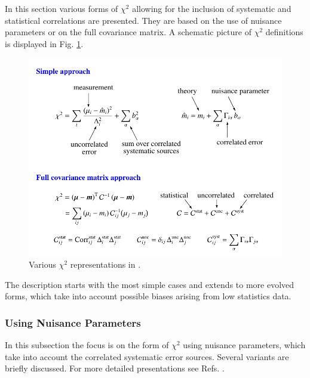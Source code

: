 \label{sec:error}
\label{sec:chi2}
In this section various forms of $\chi^2$ 
allowing for the inclusion of systematic and statistical correlations are presented.
They are based on the use of nuisance parameters or on the full covariance matrix.
A schematic picture of $\chi^2$ definitions is displayed in Fig. \ref{fig:chi2}.
\begin{figure}[htb]
\centerline{
\includegraphics[width=\linewidth]{figures/chi2.pdf}
}
\caption{Various $\chi^2$ representations in \fitter.}
\label{fig:chi2}
\end{figure}
The description starts with the most simple cases and extends to more evolved forms, which take into account possible biases 
arising from low statistics data.

\subsubsection{Using Nuisance Parameters}

\newcommand{\rs}{b}
\newcommand{\ce}{\Gamma}
\newcommand\ci{\alpha} \newcommand\ck{\beta}


In this subsection the focus is on the form of $\chi^2$
using nuisance parameters,
which take into account the correlated systematic error sources.
Several variants are briefly discussed.
For more detailed presentations see Refs. \cite{Stump:2001gu,Botje:2001fx,Aaron:2009bp}.

